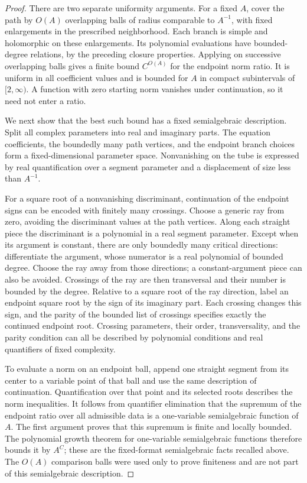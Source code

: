 \begin{proof}
There are two separate uniformity arguments.  For a fixed \(A\), cover
the path by \(O(A)\) overlapping balls of radius comparable to \(A^{-1}\),
with fixed enlargements in the prescribed neighborhood.  Each branch
is simple and holomorphic on these enlargements.  Its polynomial
evaluations have bounded-degree relations, by the preceding closure
properties.  Applying  on successive overlapping
balls gives a finite bound \(C^{O(A)}\) for the endpoint norm ratio.
It is uniform in all coefficient values and is bounded for \(A\) in
compact subintervals of \([2,\infty)\).  A function with zero starting
norm vanishes under continuation, so it need not enter a ratio.

We next show that the best such bound has a fixed semialgebraic
description.  Split all complex parameters into real and imaginary
parts.  The equation coefficients, the boundedly many path vertices,
and the endpoint branch choices form a fixed-dimensional parameter
space.  Nonvanishing on the tube is expressed by real quantification
over a segment parameter and a displacement of size less than \(A^{-1}\).

For a square root of a nonvanishing discriminant, continuation of the
endpoint signs can be encoded with finitely many crossings.  Choose a
generic ray from zero, avoiding the discriminant values at the path
vertices.  Along each straight piece the discriminant is a polynomial
in a real segment parameter.  Except when its argument is constant,
there are only boundedly many critical directions: differentiate the
argument, whose numerator is a real polynomial of bounded degree.
Choose the ray away from those directions; a constant-argument piece
can also be avoided.  Crossings of the ray are then transversal and
their number is bounded by the degree.  Relative to a square root of
the ray direction, label an endpoint square root by the sign of its
imaginary part.  Each crossing changes this sign, and the parity of
the bounded list of crossings specifies exactly the continued
endpoint root.  Crossing parameters, their order, transversality,
and the parity condition can all be described by polynomial
conditions and real quantifiers of fixed complexity.

To evaluate a norm on an endpoint ball, append one straight segment
from its center to a variable point of that ball and use the same
description of continuation.  Quantification over that point and its
selected roots describes the norm inequalities.  It follows from
quantifier elimination that the supremum of the endpoint ratio over
all admissible data is a one-variable semialgebraic function of \(A\).
The first argument proves that this supremum is finite and locally
bounded.  The polynomial growth theorem for one-variable
semialgebraic functions therefore bounds it by \(A^C\); these are the
fixed-format semialgebraic facts recalled above.
The \(O(A)\) comparison balls were used only to prove finiteness and
are not part of this semialgebraic description.


\end{proof}
